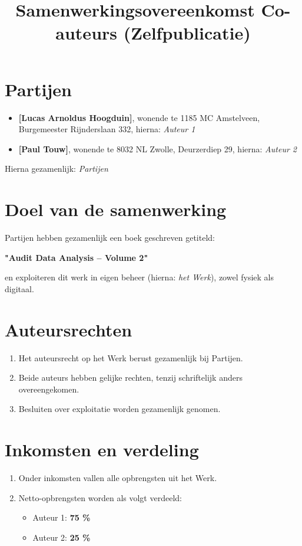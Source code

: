 \documentclass[11pt]{article}
\author{}
\begin{document}
 
\title{Samenwerkingsovereenkomst Co-auteurs (Zelfpublicatie)} 
\date{} 
\maketitle 
\section*{Partijen} 
\begin{itemize} 
    \item \textbf{[Lucas Arnoldus Hoogduin]}, wonende te 1185 MC Amstelveen, Burgemeester Rijnderslaan 332, hierna: \textit{Auteur 1} 
    \item \textbf{[Paul Touw]}, wonende te 8032 NL Zwolle, Deurzerdiep 29, hierna: \textit{Auteur 2} 
\end{itemize} 
Hierna gezamenlijk: \textit{Partijen} 

\section{Doel van de samenwerking} Partijen hebben gezamenlijk een boek geschreven getiteld: 
\begin{center} 
    \textbf{"Audit Data Analysis -- Volume 2"} 
\end{center} 
en exploiteren dit werk in eigen beheer (hierna: \textit{het Werk}), zowel fysiek als digitaal. 

\section{Auteursrechten} 

\begin{enumerate} 
    \item Het auteursrecht op het Werk berust gezamenlijk bij Partijen. 
    \item Beide auteurs hebben gelijke rechten, tenzij schriftelijk anders overeengekomen. 
    \item Besluiten over exploitatie worden gezamenlijk genomen. 
\end{enumerate} 

\section{Inkomsten en verdeling} 

\begin{enumerate} 
    \item Onder inkomsten vallen alle opbrengsten uit het Werk. 
    \item Netto-opbrengsten worden als volgt verdeeld: 
    \begin{itemize} 
        \item Auteur 1: \textbf{75 \%}
        \item Auteur 2: \textbf{25 \%}
    \end{itemize} 
\end{enumerate} 
\end{document}

